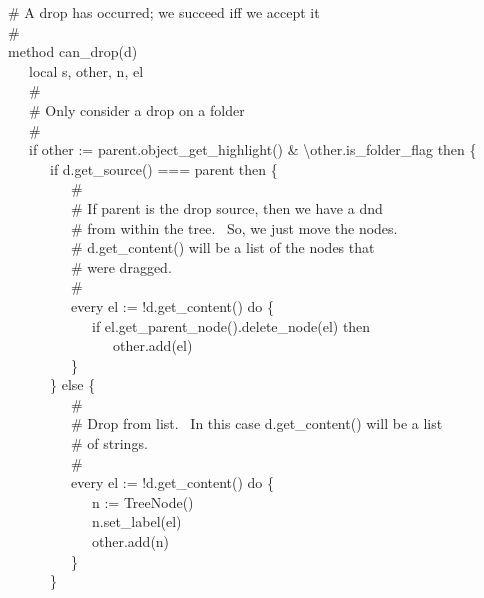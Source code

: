 {\>   \# A drop has occurred; we succeed iff we accept it \\
\>   \# \\
\>   method can\_drop(d) \\
\>   \ \ \ local s, other, n, el \\
\>   \ \ \ \# \\
\>   \ \ \ \# Only consider a drop on a folder \\
\>   \ \ \ \# \\
\>   \ \ \ if other := parent.object\_get\_highlight() \&
{\textbackslash}other.is\_folder\_flag then \{ \\
\>   \ \ \ \ \ \ if d.get\_source() === parent then \{ \\
\>   \ \ \ \ \ \ \ \ \ \# \\
\>   \ \ \ \ \ \ \ \ \ \# If parent is the drop source, then we have a
dnd \\
\>   \ \ \ \ \ \ \ \ \ \# from within the tree. \ So, we just move the
nodes. \\
\>   \ \ \ \ \ \ \ \ \ \# d.get\_content() will be a list of the nodes
that \\
\>   \ \ \ \ \ \ \ \ \ \# were dragged. \\
\>   \ \ \ \ \ \ \ \ \ \# \\
\>   \ \ \ \ \ \ \ \ \ every el := !d.get\_content() do \{ \\
\>   \ \ \ \ \ \ \ \ \ \ \ \ if el.get\_parent\_node().delete\_node(el)
then \\
\>   \ \ \ \ \ \ \ \ \ \ \ \ \ \ \ other.add(el) \\
\>   \ \ \ \ \ \ \ \ \ \} \\
\>   \ \ \ \ \ \ \} else \{ \\
\>   \ \ \ \ \ \ \ \ \ \# \\
\>   \ \ \ \ \ \ \ \ \ \# Drop from list. \ In this case d.get\_content() will be a list\\
\>   \ \ \ \ \ \ \ \ \ \# of strings. \\
\>   \ \ \ \ \ \ \ \ \ \# \\
\>   \ \ \ \ \ \ \ \ \ every el := !d.get\_content() do \{ \\
\>   \ \ \ \ \ \ \ \ \ \ \ \ n := TreeNode() \\
\>   \ \ \ \ \ \ \ \ \ \ \ \ n.set\_label(el) \\
\>   \ \ \ \ \ \ \ \ \ \ \ \ other.add(n) \\
\>   \ \ \ \ \ \ \ \ \ \} \\
\>   \ \ \ \ \ \ \} \\
}
